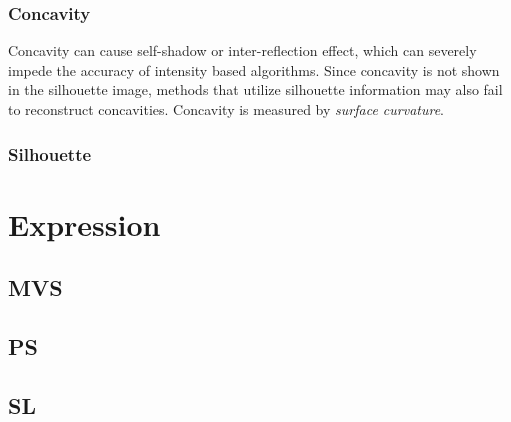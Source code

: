 \subsubsection{Concavity}
Concavity can cause self-shadow or inter-reflection effect, which can severely impede the accuracy of intensity based algorithms. Since concavity is not shown in the silhouette image, methods that utilize silhouette information may also fail to reconstruct concavities. Concavity is measured by \textit{surface curvature}.

\subsubsection{Silhouette}


\section{Expression}
\label{sec:3DRecon_Exp}

\subsection{MVS}

\subsection{PS}

\subsection{SL}
